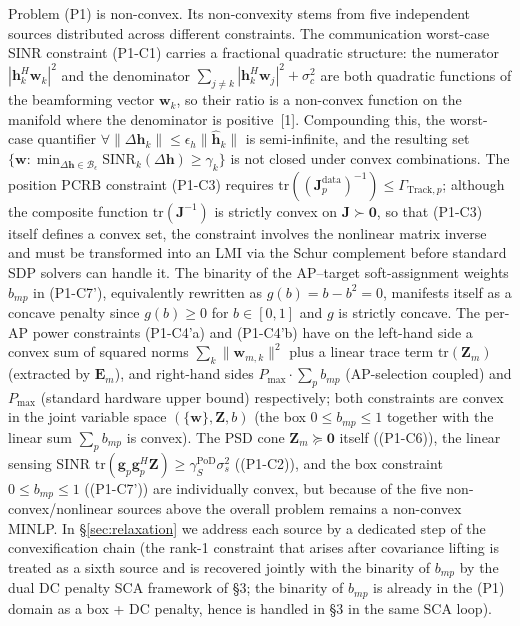 \documentclass[12pt,a4paper]{article}
\newcommand{\vect}[1]{\mathbf{#1}}
\newcommand{\mat}[1]{\mathbf{#1}}
\newcommand{\tr}{\text{tr}}
\begin{document}
Problem (P1) is non-convex. Its non-convexity stems from five independent sources distributed across different constraints. The communication worst-case SINR constraint (P1-C1) carries a fractional quadratic structure: the numerator $|\vect{h}_k^H \vect{w}_k|^2$ and the denominator $\sum_{j \neq k} |\vect{h}_k^H \vect{w}_j|^2 + \sigma_c^2$ are both quadratic functions of the beamforming vector $\vect{w}_k$, so their ratio is a non-convex function on the manifold where the denominator is positive~[1]. Compounding this, the worst-case quantifier $\forall \|\Delta\vect{h}_k\| \leq \epsilon_h \|\hat{\vect{h}}_k\|$ is semi-infinite, and the resulting set $\{\vect{w} : \min_{\Delta\vect{h} \in \mathcal{B}_\epsilon} \text{SINR}_k(\Delta\vect{h}) \geq \gamma_k\}$ is not closed under convex combinations. The position PCRB constraint (P1-C3) requires $\tr((\mat{J}_p^{\text{data}})^{-1}) \leq \Gamma_{\text{Track}, p}$; although the composite function $\tr(\mat{J}^{-1})$ is strictly convex on $\mat{J} \succ \mat{0}$, so that (P1-C3) itself defines a convex set, the constraint involves the nonlinear matrix inverse and must be transformed into an LMI via the Schur complement before standard SDP solvers can handle it. The binarity of the AP--target soft-assignment weights $b_{mp}$ in (P1-C7'), equivalently rewritten as $g(b) = b - b^2 = 0$, manifests itself as a concave penalty since $g(b) \geq 0$ for $b \in [0,1]$ and $g$ is strictly concave. The per-AP power constraints (P1-C4'a) and (P1-C4'b) have on the left-hand side a convex sum of squared norms $\sum_k \|\vect{w}_{m,k}\|^2$ plus a linear trace term $\tr(\mat{Z}_m)$ (extracted by $\mat{E}_m$), and right-hand sides $P_{\max} \cdot \sum_p b_{mp}$ (AP-selection coupled) and $P_{\max}$ (standard hardware upper bound) respectively; both constraints are convex in the joint variable space $(\{\vect{w}\}, \mat{Z}, b)$ (the box $0 \le b_{mp} \le 1$ together with the linear sum $\sum_p b_{mp}$ is convex). The PSD cone $\mat{Z}_m \succeq \mat{0}$ itself ((P1-C6)), the linear sensing SINR $\tr(\vect{g}_p \vect{g}_p^H \mat{Z}) \geq \gamma_S^{\text{PoD}} \sigma_s^2$ ((P1-C2)), and the box constraint $0 \leq b_{mp} \leq 1$ ((P1-C7')) are individually convex, but because of the five non-convex/nonlinear sources above the overall problem remains a non-convex MINLP. In \S\ref{sec:relaxation} we address each source by a dedicated step of the convexification chain (the rank-1 constraint that arises after covariance lifting is treated as a sixth source and is recovered jointly with the binarity of $b_{mp}$ by the dual DC penalty SCA framework of \S3; the binarity of $b_{mp}$ is already in the (P1) domain as a box + DC penalty, hence is handled in \S3 in the same SCA loop).
\end{document}
